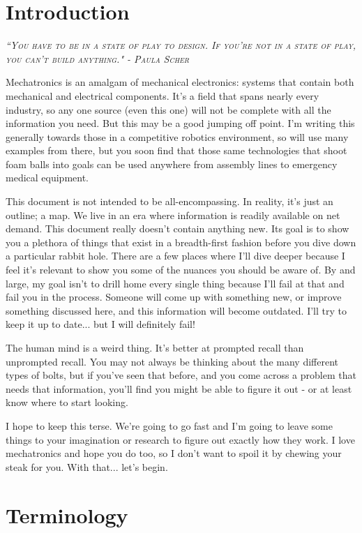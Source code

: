 
\chapter{Introduction}
 
 {\slshape \scshape ``You have to be in a state of play to design. If you're not in a state of play, you can't build anything." - Paula Scher}

Mechatronics is an amalgam of mechanical electronics: systems that contain both mechanical and electrical components. It's a field that spans nearly every industry, so any one source (even this one) will not be complete with all the information you need. But this may be a good jumping off point. I'm writing this generally towards those in a competitive robotics environment, so will use many examples from there, but you soon find that those same technologies that shoot foam balls into goals can be used anywhere from assembly lines to emergency medical equipment.

This document is not intended to be all-encompassing. In reality, it's just an outline; a map. We live in an era where information is readily available on net demand. This document really doesn't contain anything new. Its goal is to show you a plethora of things that exist in a breadth-first fashion before you dive down a particular rabbit hole. There are a few places where I'll dive deeper because I feel it's relevant to show you some of the nuances you should be aware of. By and large, my goal isn't to drill home every single thing because I'll fail at that and fail you in the process. Someone will come up with something new, or improve something discussed here, and this information will become outdated. I'll try to keep it up to date... but I will definitely fail!

The human mind is a weird thing. It's better at prompted recall than unprompted recall. You may not always be thinking about the many different types of bolts, but if you've seen that before, and you come across a problem that needs that information, you'll find you might be able to figure it out - or at least know where to start looking.

I hope to keep this terse. We're going to go fast and I'm going to leave some things to your imagination or research to figure out exactly how they work. I love mechatronics and hope you do too, so I don't want to spoil it by chewing your steak for you. With that... let's begin.

\chapter{Terminology}


